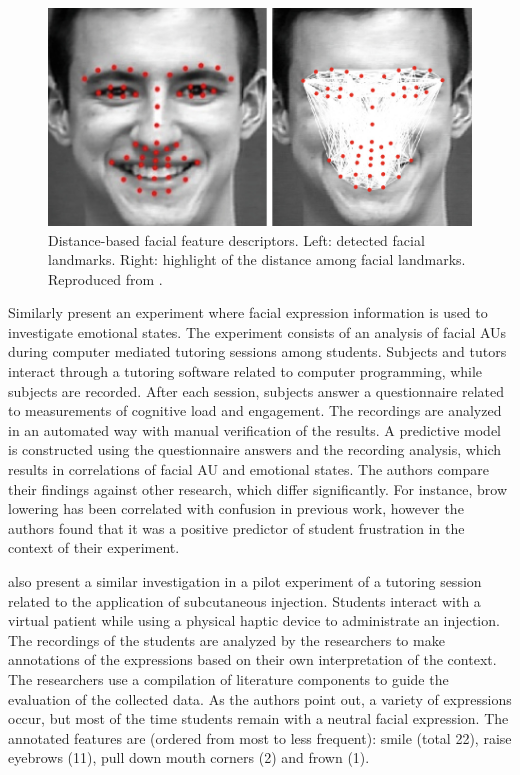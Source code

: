 \begin{figure}[h]
    \centering
    \includegraphics[width=0.75\linewidth]{Content/figures/samara2016sensing-distances.png}
    \caption{Distance-based facial feature descriptors. Left: detected facial landmarks. Right: highlight of the distance among facial landmarks. Reproduced from \textcite{samara2016sensing}.}
    \label{fig:distance-samara}
\end{figure}

Similarly \textcite{grafsgaard2013automatically} present an experiment where facial expression information is used to investigate emotional states. The experiment consists of an analysis of facial AUs during computer mediated tutoring sessions among students. Subjects and tutors interact through a tutoring software related to computer programming, while subjects are recorded. After each session, subjects answer a questionnaire related to measurements of cognitive load and engagement. The recordings are analyzed in an automated way with manual verification of the results. A predictive model is constructed using the questionnaire answers and the recording analysis, which results in correlations of facial AU and emotional states. The authors compare their findings against other research, which differ significantly. For instance, brow lowering has been correlated with confusion in previous work, however the authors found that it was a positive predictor of student frustration in the context of their experiment.

\textcite{heylen2005facial} also present a similar investigation in a pilot experiment of a tutoring session related to the application of subcutaneous injection. Students interact with a virtual patient while using a physical haptic device to administrate an injection. The recordings of the students are analyzed by the researchers to make annotations of the expressions based on their own interpretation of the context. The researchers use a compilation of literature components to guide the evaluation of the collected data. As the authors point out, a variety of expressions occur, but most of the time students remain with a neutral facial expression. The annotated features are (ordered from most to less frequent): smile (total 22), raise eyebrows (11), pull down mouth corners (2) and frown (1).

